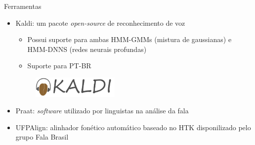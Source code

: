 \begin{frame}{Ferramentas}
    \begin{itemize}
        \item Kaldi: um pacote \textit{open-source} de reconhecimento de voz
			\begin{itemize}
				\item Possui suporte para ambas HMM-GMMs (mistura de gaussianas) e HMM-DNNS (redes neurais profundas)
				\item Suporte para PT-BR
			\end{itemize}
		\begin{figure}
		\begin{center}
			\includegraphics[width=0.4\textwidth]{Figures/kaldi}
		\end{center}
		\end{figure}

        \item Praat: \textit{software} utilizado por linguistas na  an\'alise da fala


        \item UFPAlign: alinhador fon\'etico autom\'atico baseado no HTK disponilizado pelo grupo Fala Brasil
    \end{itemize}
\end{frame}


